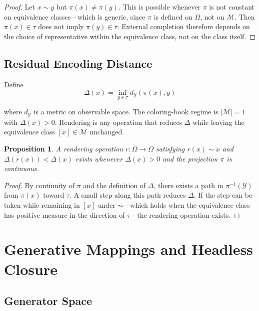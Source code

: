 \documentclass[11pt, twoside]{article}
\theoremstyle{plain}
\newtheorem{proposition}[theorem]{Proposition}
\theoremstyle{definition}
\theoremstyle{remark}
\begin{document}
\begin{proof}
Let $x \sim y$ but $\pi(x) \neq \pi(y)$. This is possible whenever $\pi$ is not constant on equivalence classes---which is generic, since $\pi$ is defined on $\Omega$, not on $\mathcal{M}$. Then $\pi(x) \in \tau$ does not imply $\pi(y) \in \tau$. External completion therefore depends on the choice of representative within the equivalence class, not on the class itself.
\end{proof}

\subsection{Residual Encoding Distance}

Define
\[
\Delta(x) = \inf_{y \in \tau} d_{\mathcal{Y}}(\pi(x), y)
\]

where $d_{\mathcal{Y}}$ is a metric on observable space. The coloring-book regime is $|\mathcal{M}| = 1$ with $\Delta(x) > 0$. Rendering is any operation that reduces $\Delta$ while leaving the equivalence class $[x] \in \mathcal{M}$ unchanged.

\begin{proposition}
A rendering operation $r : \Omega \to \Omega$ satisfying $r(x) \sim x$ and $\Delta(r(x)) < \Delta(x)$ exists whenever $\Delta(x) > 0$ and the projection $\pi$ is continuous.
\end{proposition}

\begin{proof}
By continuity of $\pi$ and the definition of $\Delta$, there exists a path in $\pi^{-1}(\mathcal{Y})$ from $\pi(x)$ toward $\tau$. A small step along this path reduces $\Delta$. If the step can be taken while remaining in $[x]$ under $\sim$---which holds when the equivalence class has positive measure in the direction of $\tau$---the rendering operation exists.
\end{proof}

\section{Generative Mappings and Headless Closure}
\label{app:generator}

\subsection{Generator Space}
\end{document}
